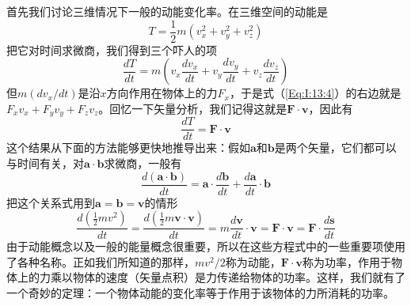 首先我们讨论三维情况下一般的动能变化率。在三维空间的动能是
\begin{equation*}
    T=\frac{1}{2}m(v_x^2+v_y^2+v_z^2)
\end{equation*}
把它对时间求微商，我们得到三个吓人的项
\begin{equation}
    \label{Eq:I:13:4}
    \frac{dT}{dt}=m(v_x\frac{dv_x}{dt}+v_y\frac{dv_y}{dt}+v_z\frac{dv_z}{dt})
\end{equation}
但$m(dv_x/dt)$是沿$x$方向作用在物体上的力$F_x$，于是式（\ref{Eq:I:13:4}）的右边就是$F_xv_x+F_yv_y+F_zv_z$。回忆一下矢量分析，我们记得这就是$\boldsymbol{F} \cdot \boldsymbol{v}$，因此有
\begin{equation}
    \label{Eq:I:13:5}
    \frac{dT}{dt}=\boldsymbol{F} \cdot \boldsymbol{v}
\end{equation}
这个结果从下面的方法能够更快地推导出来：假如$\boldsymbol{a}$和$\boldsymbol{b}$是两个矢量，它们都可以与时间有关，对$\boldsymbol{a} \cdot \boldsymbol{b}$求微商，一般有
\begin{equation}
    \label{Eq:I:13:6}
    \frac{d(\boldsymbol{a} \cdot \boldsymbol{b})}{dt}=\boldsymbol{a} \cdot \frac{d\boldsymbol{b}}{dt} + \frac{d\boldsymbol{a}}{dt} \cdot \boldsymbol{b}
\end{equation}
把这个关系式用到$\boldsymbol{a}=\boldsymbol{b}=\boldsymbol{v}$的情形
\begin{equation}
    \label{Eq:I:13:7}
    \frac{d(\frac{1}{2}mv^2)}{dt}=\frac{d(\frac{1}{2}m\boldsymbol{v} \cdot \boldsymbol{v})}{dt}=m\frac{d \boldsymbol{v}}{dt} \cdot \boldsymbol{v}=\boldsymbol{F} \cdot \boldsymbol{v}=\boldsymbol{F} \cdot \frac{d \boldsymbol{s}}{dt}
\end{equation}
由于动能概念以及一般的能量概念很重要，所以在这些方程式中的一些重要项使用了各种名称。正如我们所知道的那样，$mv^2/2$称为动能，$\boldsymbol{F} \cdot \boldsymbol{v}$称为功率，作用于物体上的力乘以物体的速度（矢量点积）是力传递给物体的功率。这样，我们就有了一个奇妙的定理：一个物体动能的变化率等于作用于该物体的力所消耗的功率。

